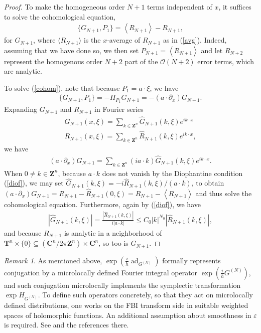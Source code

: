\documentclass[12pt,lettersize]{article}
\renewcommand{\epsilon}{\varepsilon}
\newcommand{\poiss}[1]{\{#1\}}
\theoremstyle{plain}%
\numberwithin{theorem}{section}
\numberwithin{equation}{section}
\theoremstyle{definition}
\theoremstyle{remark}
\newtheorem{remark}[theorem]{Remark}
\DeclareMathOperator{\aad}{ad}
\begin{document}
{\begin{proof}
To make the homogeneous order $N+1$ terms independent of $x$, it suffices to solve the cohomological equation,
%
\begin{align}\label{cohom}
\poiss{ G_{N+1},P_1} = \left\langle R_{N+1} \right\rangle - R_{N+1},
\end{align}
%
for $G_{N+1}$, where $\langle R_{N+1} \rangle$ is the $x$-average of $R_{N+1}$ as in (\ref{avg}). Indeed, assuming that we have done so, we then set $P_{N+1} = \left\langle R_{N+1} \right\rangle$ and let $R_{N+2}$ represent the homogenous order $N+2$ part of the $\mathcal{O}(N+2)$ error terms, which are analytic.  

To solve (\ref{cohom}), note that because $P_1 = a\cdot \xi$, we have 
%
\begin{align*}
\poiss{G_{N+1},P_1} = -H_{P_1} G_{N+1} = -(a\cdot \partial_x) G_{N+1}.
\end{align*}
%
Expanding $G_{N+1}$ and $R_{N+1}$ in Fourier series
%
\begin{align*}{}
G_{N+1}(x,\xi) = \sum_{k\in \mathbf{Z}^n} \widehat{G}_{N+1}(k,\xi)e^{i k\cdot x} \\
R_{N+1}(x,\xi) = \sum_{k\in \mathbf{Z}^n} \widehat{R}_{N+1}(k,\xi)e^{i k\cdot x},
\end{align*}
%
we have
%
\begin{align*}{}
(a\cdot \partial_x) G_{N+1} = \sum_{k\in \mathbf{Z}^n} (i a\cdot k)\widehat{G}_{N+1}(k,\xi)e^{i k\cdot x}.
\end{align*}
%
When $0 \neq k \in \mathbf{Z}^n$, because $a\cdot k$ does not vanish by the Diophantine condition (\ref{diof}), we may set $\widehat{G}_{N+1}(k,\xi) = -i \widehat{R}_{N+1}(k,\xi) / (a\cdot k)$, to obtain $(a\cdot \partial_x) G_{N+1} = R_{N+1} - \widehat{R}_{N+1}(0,\xi) = R_{N+1} - \left\langle R_{N+1} \right\rangle$ and thus solve the cohomological equation. Furthermore, again by (\ref{diof}), we have
%
\begin{align*}{}
|\widehat{G}_{N+1}(k,\xi)| = \frac{|\widehat{R}_{N+1}(k,\xi)|}{i |a\cdot k|} \leq C_0 |k|^{N_0}|\widehat{R}_{N+1}(k,\xi)|,
\end{align*}
%
and because $R_{N+1}$ is analytic in a neighborhood of $\mathbf{T}^n \times \{0\} \subseteq (\mathbf{C}^{n}/ 2\pi \mathbf{Z}^n) \times\mathbf{C}^n$, so too is $G_{N+1}$.
\end{proof}


\begin{remark}
As mentioned above, $\exp(\frac{i}{h}\aad_{G^{(N)}})$ formally represents conjugation by a microlocally defined Fourier integral operator $\exp(\frac{i}{h}G^{(N)})$, and such conjugation microlocally implements the symplectic transformation $\exp H_{G^{(N)}}$. To define such operators concretely, so that they act on microlocally defined distributions, one works on the FBI transform side in suitable weighted spaces of holomorphic functions. An additional assumption about smoothness in $\epsilon$ is required. See \cite{HSV} and the references there. 
\end{remark}

}
\end{document}
